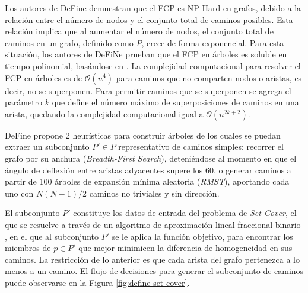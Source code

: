Los autores de DeFine demuestran que el FCP es NP-Hard en grafos, debido a la relaci\'on entre el n\'umero de nodos y el conjunto total de caminos posibles. Esta relaci\'on implica que al aumentar el n\'umero de nodos, el conjunto total de caminos en un grafo, definido como $P$, crece de forma exponencial. Para esta situaci\'on, los autores de DeFiNe prueban que el FCP en \'arboles es soluble en tiempo polinomial, bas\'andose en \cite{lin2006vertex}. La complejidad computacional para resolver el FCP en \'arboles es de $\mathcal{O}(n^{4})$ para caminos que no comparten nodos o aristas, es decir, no se superponen. Para permitir caminos que se superponen se agrega el par\'ametro $k$ que define el n\'umero m\'aximo de superposiciones de caminos en una arista, quedando la complejidad computacional igual a $\mathcal{O}(n^{2k+2})$.


DeFine propone 2 heur\'isticas para construir \'arboles de los cuales se puedan extraer un subconjunto $P' \in P$ representativo de caminos simples: recorrer el grafo por su anchura ({\it Breadth-First Search}), deteni\'endose al momento en que el \'angulo de deflexi\'on entre aristas adyacentes supere los 60\degree, o generar caminos a partir de 100 \'arboles de expansi\'on m\'inima aleatoria ({\it RMST}), aportando cada uno con $N(N-1)/2$ caminos no triviales y sin direcci\'on. 


El subconjunto $P'$ constituye los datos de entrada del problema de {\it Set Cover}, el que se resuelve a trav\'es de un algoritmo de aproximaci\'on lineal fraccional binario \cite{breuer2015define}, en el que al subconjunto $P'$ se le aplica la funci\'on objetivo, para encontrar los miembros de $p \in P'$ que mejor minimicen la diferencia de homogeneidad en sus caminos. La restricci\'on de lo anterior es que cada arista del grafo pertenezca a lo menos a un camino. El flujo de decisiones para generar el subconjunto de caminos puede observarse en la Figura \ref{fig:define-set-cover}.

